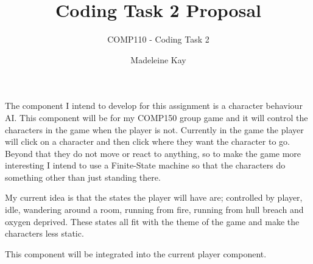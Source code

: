 \documentclass{scrartcl}
\title{Coding Task 2 Proposal}
\subtitle{COMP110 - Coding Task 2}
\author{Madeleine Kay}
\begin{document}
\maketitle

The component I intend to develop for this assignment is a character behaviour AI. 
This component will be for my COMP150 group game and it will control the characters in the game when the player is not. Currently in the game the player will click on a character and then click where they want the character to go. Beyond that they do not move or react to anything, so to make the game more interesting I intend to use a Finite-State machine so that the characters do something other than just standing there.


My current idea is that  the states the player will have are; controlled by player, idle, wandering around a room, running from fire, running from hull breach and oxygen deprived. These states all fit with the theme of the game and make the characters less static. 

This component will be integrated into the current player component.






\end{document}
